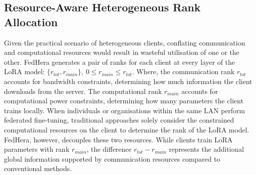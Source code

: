 \documentclass{article}
\begin{document}
\subsection{Resource-Aware Heterogeneous Rank Allocation}
Given the practical scenario of heterogeneous clients, conflating communication and computational resources would result in wasteful utilisation of one or the other. FedHera generates a pair of ranks for each client at every layer of the LoRA model: $\{r_{tot},r_{main}\},\ 0 \leq r_{main} \leq r_{tot}$. Where, the communication rank $r_{tot}$ accounts for bandwidth constraints, determining how much information the client downloads from the server. The computational rank $r_{main}$ accounts for computational power constraints, determining how many parameters the client trains locally. When individuals or organisations within the same LAN perform federated fine-tuning, traditional approaches solely consider the constrained computational resources on the client to determine the rank of the LoRA model. FedHera, however, decouples these two resources. While clients train LoRA parameters with rank $r_{main}$, the difference $r_{tot} - r_{main}$ represents the additional global information supported by communication resources compared to conventional methods.
\end{document}
